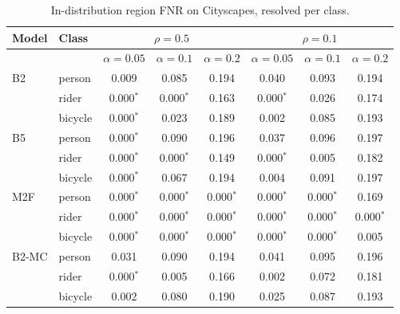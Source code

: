 \begin{table}[t]
\centering
\caption{In-distribution region FNR on Cityscapes, resolved per class.}
\label{tab:perclass}
\scriptsize
\setlength{\tabcolsep}{2pt}
\begin{tabular}{llcccccc}
\toprule
Model & Class & \multicolumn{3}{c}{$\rho=0.5$} & \multicolumn{3}{c}{$\rho=0.1$} \\
\midrule
 & & $\alpha=0.05$ & $\alpha=0.1$ & $\alpha=0.2$ & $\alpha=0.05$ & $\alpha=0.1$ & $\alpha=0.2$ \\
\midrule
B2 & person & 0.009 & 0.085 & 0.194 & 0.040 & 0.093 & 0.194 \\
 & rider & 0.000$^{\ast}$ & 0.000$^{\ast}$ & 0.163 & 0.000$^{\ast}$ & 0.026 & 0.174 \\
 & bicycle & 0.000$^{\ast}$ & 0.023 & 0.189 & 0.002 & 0.085 & 0.193 \\
\addlinespace
B5 & person & 0.000$^{\ast}$ & 0.090 & 0.196 & 0.037 & 0.096 & 0.197 \\
 & rider & 0.000$^{\ast}$ & 0.000$^{\ast}$ & 0.149 & 0.000$^{\ast}$ & 0.005 & 0.182 \\
 & bicycle & 0.000$^{\ast}$ & 0.067 & 0.194 & 0.004 & 0.091 & 0.197 \\
\addlinespace
M2F & person & 0.000$^{\ast}$ & 0.000$^{\ast}$ & 0.000$^{\ast}$ & 0.000$^{\ast}$ & 0.000$^{\ast}$ & 0.169 \\
 & rider & 0.000$^{\ast}$ & 0.000$^{\ast}$ & 0.000$^{\ast}$ & 0.000$^{\ast}$ & 0.000$^{\ast}$ & 0.000$^{\ast}$ \\
 & bicycle & 0.000$^{\ast}$ & 0.000$^{\ast}$ & 0.000$^{\ast}$ & 0.000$^{\ast}$ & 0.000$^{\ast}$ & 0.005 \\
\addlinespace
B2-MC & person & 0.031 & 0.090 & 0.194 & 0.041 & 0.095 & 0.196 \\
 & rider & 0.000$^{\ast}$ & 0.005 & 0.166 & 0.002 & 0.072 & 0.181 \\
 & bicycle & 0.002 & 0.080 & 0.190 & 0.025 & 0.087 & 0.193 \\
\bottomrule
\end{tabular}
\end{table}
